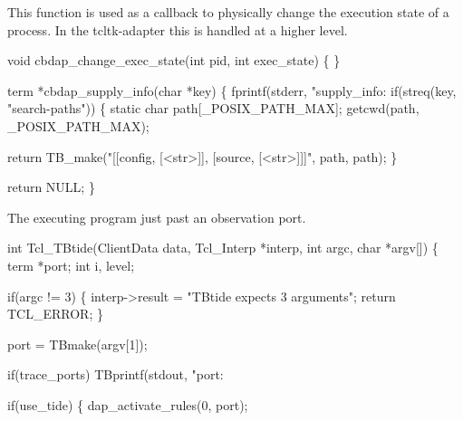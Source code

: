 
This function is used as a callback to physically change
the execution state of a process.
In the tcltk-adapter this is handled at a higher level.

\nwenddocs{}\endmoddef\let\nwnotused=\nwoutput{}
void cbdap_change_exec_state(int pid, int exec_state)
\{
\}
\nwendcode{}\nwdocspar


\nwenddocs{}\endmoddef\let\nwnotused=\nwoutput{}
term *cbdap_supply_info(char *key)
\{
  fprintf(stderr, "supply_info: %
  if(streq(key, "search-paths")) \{
    static char path[_POSIX_PATH_MAX];
    getcwd(path, _POSIX_PATH_MAX);

    return TB_make("[[config, [<str>]], [source, [<str>]]]", path, path);
  \}

  return NULL;
\}
\nwendcode{}\nwdocspar



The executing program just past an observation port.

\nwenddocs{}\endmoddef\let\nwnotused=\nwoutput{}
int Tcl_TBtide(ClientData data, Tcl_Interp *interp, int argc, char *argv[])
\{
  term *port;
  int i, level;

  if(argc != 3) \{
    interp->result = "TBtide expects 3 arguments";
    return TCL_ERROR;
  \}

  port = TBmake(argv[1]);

  if(trace_ports)
    TBprintf(stdout, "port: %

  if(use_tide) \{
    dap_activate_rules(0, port);

